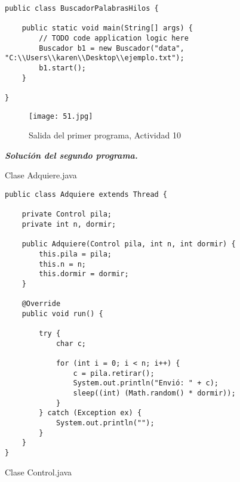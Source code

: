 \begin{verbatim}
public class BuscadorPalabrasHilos {

    public static void main(String[] args) {
        // TODO code application logic here
        Buscador b1 = new Buscador("data", "C:\\Users\\karen\\Desktop\\ejemplo.txt");
        b1.start();
    }
    
}
\end{verbatim} \vspace{1cm}
\begin{figure}[h!]
		\centering
		{\texttt{[image: 51.jpg]}\par} 
		\caption{Salida del primer programa, Actividad 10}\vspace{1cm}
\end{figure}

\textbf{\textit{Solución del segundo programa.}}

\begin{center}
Clase Adquiere.java
\end{center}

\begin{verbatim}
public class Adquiere extends Thread {

    private Control pila;
    private int n, dormir;

    public Adquiere(Control pila, int n, int dormir) {
        this.pila = pila;
        this.n = n;
        this.dormir = dormir;
    }

    @Override
    public void run() {

        try {
            char c;

            for (int i = 0; i < n; i++) {
                c = pila.retirar();
                System.out.println("Envió: " + c);
                sleep((int) (Math.random() * dormir));
            }
        } catch (Exception ex) {
            System.out.println("");
        }
    }
}
\end{verbatim} \vspace{1cm}

\begin{center}
Clase Control.java
\end{center}

